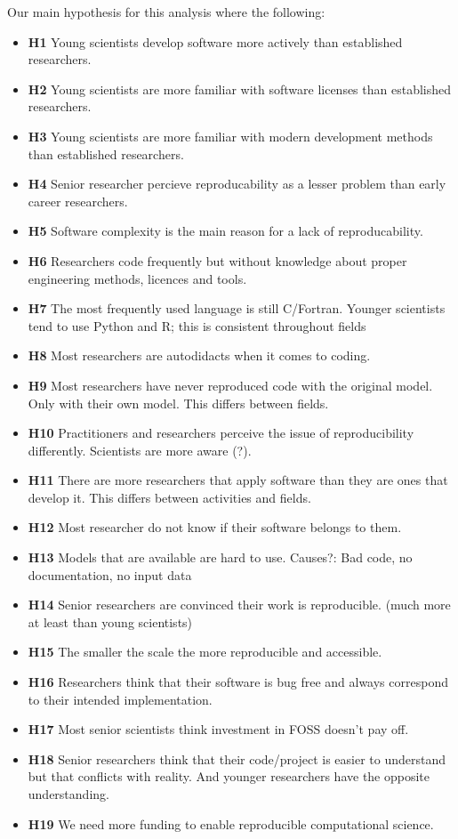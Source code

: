 \documentclass{article}
\begin{document}
Our main hypothesis for this analysis where the following:
\begin{itemize}
	\item \textbf{H1} Young scientists develop software more actively than established researchers.
	\item \textbf{H2} Young scientists are more familiar with software licenses than established researchers. 
	\item \textbf{H3} Young scientists are more familiar with modern development methods than established researchers. 
	\item \textbf{H4} Senior researcher percieve reproducability as a lesser problem than early career researchers.
 	\item \textbf{H5} Software complexity is the main reason for a lack of reproducability.
 	\item \textbf{H6} Researchers code frequently but without knowledge about proper engineering methods, licences and tools. 
 	\item \textbf{H7} The most frequently used language is still C/Fortran. Younger scientists tend to use Python and R; this is consistent throughout fields 
 	\item \textbf{H8} Most researchers are autodidacts when it comes to coding. 
 	\item \textbf{H9} Most researchers have never reproduced code with the original model. Only with their own model. This differs between fields. 
 	\item \textbf{H10} Practitioners and researchers perceive the issue of reproducibility differently. Scientists are more aware (?). 
	\item \textbf{H11} There are more researchers that apply software than they are ones that develop it. This differs between activities and fields. 
 	\item \textbf{H12} Most researcher do not know if their software belongs to them. 
 	\item \textbf{H13} Models that are available are hard to use. Causes?: Bad code, no documentation, no input data 
 	\item \textbf{H14} Senior researchers are convinced their work is reproducible. (much more at least than young scientists) 
 	\item \textbf{H15} The smaller the scale the more reproducible and accessible. 
 	\item \textbf{H16} Researchers think that their software is bug free and always correspond to their intended implementation. 
 	\item \textbf{H17} Most senior scientists think investment in FOSS doesn’t pay off. 
 	\item \textbf{H18} Senior researchers think that their code/project is easier to understand but that conflicts with reality. And younger researchers have the opposite understanding. 
 	\item \textbf{H19} We need more funding to enable reproducible computational science. 
\end{itemize}
\end{document}
